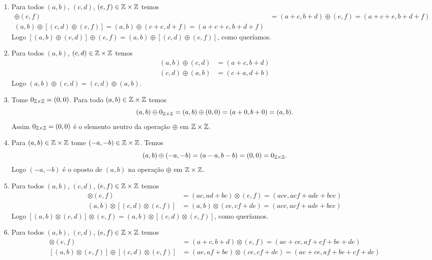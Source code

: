 \documentclass[12pt]{article}
\begin{document}
	\begin{enumerate}
		\item Para todos $(a, b)$, $(c, d)$, $(e, f) \in \mathbb{Z} \times \mathbb{Z}$ temos
		\begin{align*}
			[(a, b) \oplus (c, d)] \oplus (e, f) &= (a + c, b + d) \oplus (e, f) = (a + c + e, b + d + f)\\
			(a, b) \oplus [(c, d) \oplus (e, f)] = (a, b) \oplus (c + e, d + f) = (a + c + e, b + d + f)
		\end{align*}
		Logo $[(a, b) \oplus (c, d)] \oplus (e, f) = (a, b) \oplus [(c, d) \oplus (e, f)]$, como queríamos.

		\item Para todos $(a, b)$, $(c, d) \in \mathbb{Z} \times \mathbb{Z}$ temos
		\begin{align*}
			(a, b) \oplus (c, d) &= (a + c, b + d)\\
			(c, d) \oplus (a, b) &= (c + a, d + b)
		\end{align*}
		Logo $(a, b) \oplus (c, d) = (c, d) \oplus (a, b)$.

		\item Tome $0_{\mathbb{Z} \times \mathbb{Z}} = (0, 0)$. Para todo $(a, b) \in \mathbb{Z} \times \mathbb{Z}$ temos
		\[
			(a, b) \oplus 0_{\mathbb{Z} \times \mathbb{Z}} = (a, b) \oplus (0, 0) = (a + 0, b + 0) = (a, b).
		\]
		Assim $0_{\mathbb{Z} \times \mathbb{Z}} = (0, 0)$ é o elemento neutro da operação $\oplus$ em $\mathbb{Z} \times \mathbb{Z}$.

		\item Para $(a, b) \in \mathbb{Z} \times \mathbb{Z}$ tome $(-a, -b) \in \mathbb{Z} \times \mathbb{Z}$. Temos
		\[
			(a, b) \oplus (-a, -b) = (a - a, b - b) = (0, 0) = 0_{\mathbb{Z} \times \mathbb{Z}}.
		\]
		Logo $(-a, -b)$ é o oposto de $(a, b)$ na operação $\oplus$ em $\mathbb{Z} \times \mathbb{Z}$.

		\item Para todos $(a, b)$, $(c, d)$, $(e, f) \in \mathbb{Z} \times \mathbb{Z}$ temos
		\begin{align*}
			[(a, b) \otimes (c, d)] \otimes (e, f) &= (ac, ad + bc) \otimes (e, f) = (ace, acf + ade + bce)\\
			(a, b) \otimes [(c, d) \otimes (e, f)] &= (a, b) \otimes (ce, cf + de) = (ace, acf + ade + bce)
		\end{align*}
		Logo $[(a, b) \otimes (c, d)] \otimes (e, f) = (a, b) \otimes [(c, d) \otimes (e, f)]$, como queríamos.

		\item Para todos $(a, b)$, $(c, d)$, $(e, f) \in \mathbb{Z} \times \mathbb{Z}$ temos
		\begin{align*}
			[(a, b) \oplus (c, d)] \otimes (e, f) &= (a + c, b + d) \otimes (e, f) = (ae + ce, af + cf + be + de)\\
			[(a, b) \otimes (e, f)] \oplus [(c, d) \otimes (e, f)] &= (ae, af + be) \otimes (ce, cf + de) = (ae + ce, af + be + cf + de)
		\end{align*}


\end{enumerate}
\end{document}
